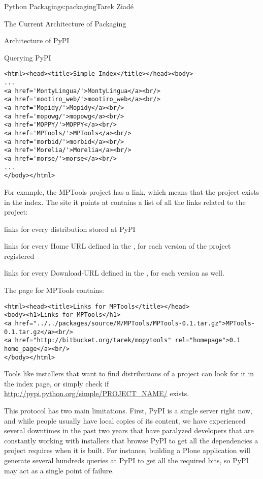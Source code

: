 \begin{aosachapter}{Python Packaging}{s:packaging}{Tarek Ziad\'{e}}
\begin{aosasect1}{The Current Architecture of Packaging}
\begin{aosasect2}{Architecture of PyPI}
\begin{aosasect3}{Querying PyPI}
\begin{verbatim}
<html><head><title>Simple Index</title></head><body>
...
<a href='MontyLingua/'>MontyLingua</a><br/>
<a href='mootiro_web/'>mootiro_web</a><br/>
<a href='Mopidy/'>Mopidy</a><br/>
<a href='mopowg/'>mopowg</a><br/>
<a href='MOPPY/'>MOPPY</a><br/>
<a href='MPTools/'>MPTools</a><br/>
<a href='morbid/'>morbid</a><br/>
<a href='Morelia/'>Morelia</a><br/>
<a href='morse/'>morse</a><br/>
...
</body></html>
\end{verbatim}

\noindent For example, the MPTools project has a  link, which
means that the project exists in the index.  The site it points at
contains a list of all the links related to the project:

\begin{aosaitemize}

  \item links for every distribution stored at PyPI

  \item links for every Home URL defined in the , for
  each version of the project registered

  \item links for every Download-URL defined in the , for
  each version as well.

\end{aosaitemize}

\noindent
The page for MPTools contains:

\begin{verbatim}
<html><head><title>Links for MPTools</title></head>
<body><h1>Links for MPTools</h1>
<a href="../../packages/source/M/MPTools/MPTools-0.1.tar.gz">MPTools-0.1.tar.gz</a><br/>
<a href="http://bitbucket.org/tarek/mopytools" rel="homepage">0.1 home_page</a><br/>
</body></html>
\end{verbatim}

\noindent
Tools like installers that want to find distributions of a project can
look for it in the index page, or simply check if
\url{http://pypi.python.org/simple/PROJECT_NAME/} exists.

This protocol has two main limitations.  First, PyPI is a single
server right now, and while people usually have local copies of its
content, we have experienced several downtimes in the past two years
that have paralyzed developers that are constantly working with
installers that browse PyPI to get all the dependencies a project
requires when it is built. For instance, building a Plone application
will generate several hundreds queries at PyPI to get all the required
bits, so PyPI may act as a single point of failure.


\end{aosasect3}
\end{aosasect2}
\end{aosasect1}
\end{aosachapter}
